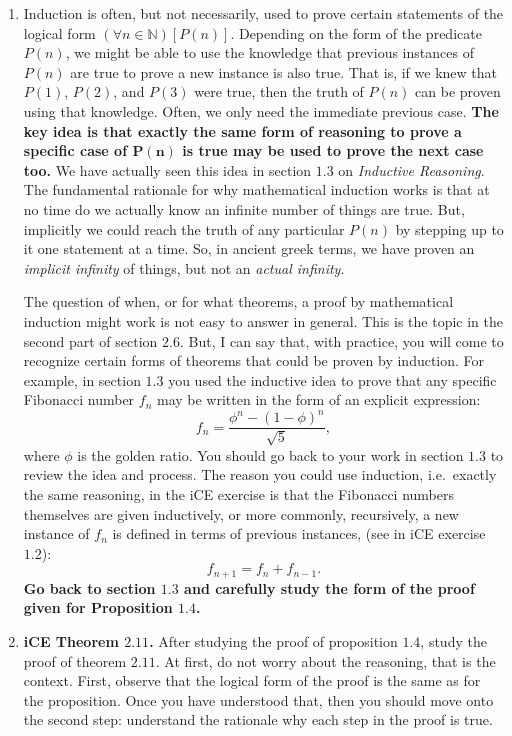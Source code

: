\documentclass[12pt,letterpaper]{article}
\theoremstyle{definition}
\begin{document}
\begin{enumerate}
    \item Induction is often, but not necessarily, used to prove certain statements of the logical form $(\forall n\in\mathbb{N})[P(n)]$. Depending on the form of the predicate $P(n)$, we might be able to use the knowledge that previous instances of $P(n)$ are true to prove a new instance is also true. That is, if we knew that $P(1)$, $P(2)$, and $P(3)$ were true, then the truth of $P(n)$ can be proven using that knowledge. Often, we only need the immediate previous case.
    \textbf{ The key idea is that exactly the same form of reasoning to prove a specific case of $\mathbf{P(n)}$ is true may be used to prove the next case too.} We have actually seen this idea in section $1.3$ on \textit{Inductive Reasoning}. The fundamental rationale for why mathematical induction works is that at no time do we actually know an infinite number of things are true. But, implicitly we could reach the truth of any particular $P(n)$ by stepping up to it one statement at a time. So, in ancient greek terms, we have proven an \textit{implicit infinity} of things, but not an \textit{actual infinity}.
    
    The question of when, or for what theorems, a proof by mathematical induction might work is not easy to answer in general. This is the topic in the second part of section $2.6$. But, I can say that, with practice, you will come to recognize certain forms of theorems that could be proven by induction. For example, in section $1.3$ you used the inductive idea to prove that any specific Fibonacci number $f_n$ may be written in the form of an explicit expression:
    \[
      f_n = \frac{\phi^n-(1-\phi)^n}{\sqrt{5}},
    \]
   where $\phi$ is the golden ratio. You should go back to your work in section $1.3$ to review the idea and process. The reason you could use induction, i.e.~exactly the same reasoning, in the iCE exercise is that the Fibonacci numbers themselves are given inductively, or more commonly, recursively, a new instance of $f_n$ is defined in terms of previous instances, (see in iCE exercise $1.2$):
   \[
     f_{n+1} = f_{n} +f_{n-1}.
   \]
   \textbf{Go back to section $1.3$ and carefully study the form of the proof
   given for Proposition $1.4$.}

    \item {\bfseries iCE Theorem $2.11$.} After studying the proof of proposition $1.4$, study the proof of theorem $2.11$. At first, do not worry about the reasoning, that is the context. First, observe that the logical form of the proof is the same as for the proposition. Once you have understood that, then you should move onto the second step: understand the rationale why each step in the proof is true.
    

\end{enumerate}
\end{document}
